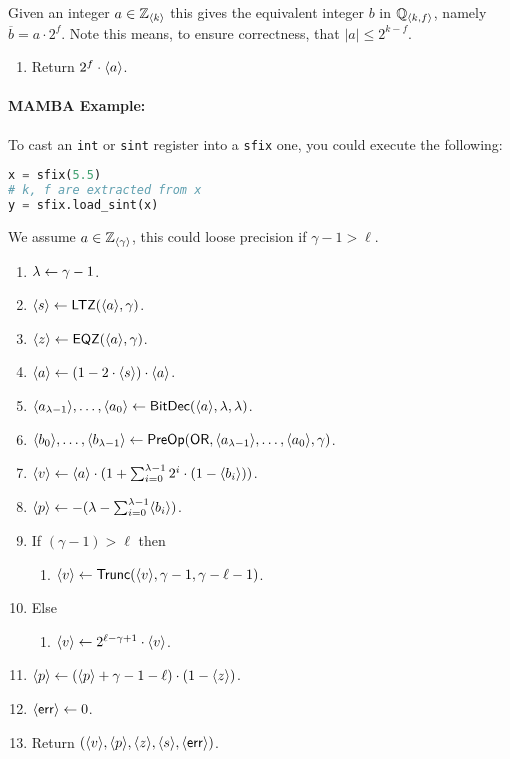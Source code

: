 Given an integer $a \in {\mathbb{Z}}_{\langle k \rangle}$ this gives the equivalent integer $b$
in ${\mathbb{Q}}_{\langle k, f \rangle}$, namely $\overline{b}=a \cdot 2^f$.
Note this means, to ensure correctness, that $|a|\le 2^{k-f}$.
\begin{enumerate}
\item Return $2^f \cdot \langle a \rangle$.
\end{enumerate}

\paragraph{MAMBA Example:} To cast an \verb|int| or \verb|sint| register into a \verb|sfix| one, you could execute the following: 
\begin{lstlisting}[language={python}]
x = sfix(5.5)
# k, f are extracted from x
y = sfix.load_sint(x)
\end{lstlisting}

We assume $a \in {\mathbb{Z}}_{\langle \gamma \rangle}$, this could loose precision if $\gamma-1>\ell$.
\begin{enumerate}
\item $\lambda \leftarrow \gamma-1$.
\item $\langle s \rangle \leftarrow \mathsf{LTZ}(\langle a \rangle,\gamma)$.
\item $\langle z \rangle \leftarrow \mathsf{EQZ}(\langle a \rangle,\gamma)$.
\item $\langle a \rangle \leftarrow (1- 2 \cdot \langle s \rangle) \cdot \langle a \rangle$.
\item $\langle a_{\lambda-1} \rangle,\ldots,\langle a_0 \rangle
		\leftarrow \mathsf{BitDec}(\langle a \rangle,\lambda,\lambda)$.
\item $\langle b_0 \rangle,\ldots,\langle b_{\lambda-1} \rangle \leftarrow
 \mathsf{PreOp}(\mathsf{OR},\langle a_{\lambda-1} \rangle,\ldots,\langle a_0 \rangle,\gamma)$.
\item $\langle v \rangle \leftarrow \langle a \rangle \cdot
	( 1+\sum_{i=0}^{\lambda-1} 2^i \cdot (1-\langle b_i \rangle))$.
\item $\langle p \rangle \leftarrow - (\lambda-\sum_{i=0}^{\lambda-1} \langle b_i \rangle)$.
\item If $(\gamma-1)>\ell$ then
\begin{enumerate}
  \item $\langle v \rangle \leftarrow \mathsf{Trunc}(\langle v \rangle,\gamma-1,\gamma-\ell-1)$.
\end{enumerate}
\item Else
\begin{enumerate}
  \item $\langle v \rangle \leftarrow 2^{\ell-\gamma+1} \cdot \langle v \rangle$.
\end{enumerate}
\item $\langle p \rangle \leftarrow (\langle p \rangle+\gamma-1-\ell) \cdot (1-\langle z \rangle)$.
\item $\langle \mathsf{err} \rangle \leftarrow 0$.
\item Return $(\langle v \rangle,\langle p \rangle,\langle z \rangle,\langle s \rangle,\langle \mathsf{err} \rangle)$.
\end{enumerate}

